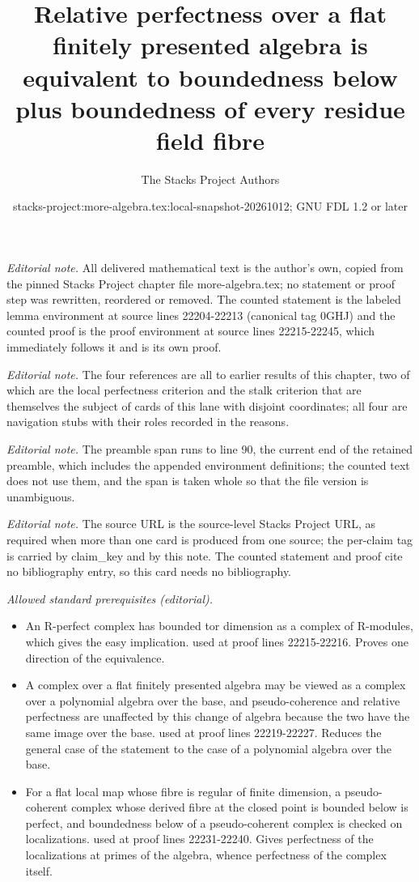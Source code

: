 \documentclass[10pt,a4paper]{amsart}
\title{Relative perfectness over a flat finitely presented algebra is equivalent to boundedness below plus boundedness of every residue field fibre}
\author{The Stacks Project Authors}
\date{stacks-project:more-algebra.tex:local-snapshot-20261012; GNU FDL 1.2 or later}
\theoremstyle{plain}
\theoremstyle{definition}
\theoremstyle{remark}
\numberwithin{equation}{subsection}
\begin{document}
\maketitle
\setcounter{subsection}{1}
\noindent\textit{Editorial note.} All delivered mathematical text is the author's own, copied from the pinned Stacks Project chapter file more-algebra.tex; no statement or proof step was rewritten, reordered or removed. The counted statement is the labeled lemma environment at source lines 22204-22213 (canonical tag 0GHJ) and the counted proof is the proof environment at source lines 22215-22245, which immediately follows it and is its own proof.\par\medskip
\noindent\textit{Editorial note.} The four references are all to earlier results of this chapter, two of which are the local perfectness criterion and the stalk criterion that are themselves the subject of cards of this lane with disjoint coordinates; all four are navigation stubs with their roles recorded in the reasons.\par\medskip
\noindent\textit{Editorial note.} The preamble span runs to line 90, the current end of the retained preamble, which includes the appended environment definitions; the counted text does not use them, and the span is taken whole so that the file version is unambiguous.\par\medskip
\noindent\textit{Editorial note.} The source URL is the source-level Stacks Project URL, as required when more than one card is produced from one source; the per-claim tag is carried by claim\_key and by this note. The counted statement and proof cite no bibliography entry, so this card needs no bibliography.\par\medskip
\noindent\textit{Allowed standard prerequisites (editorial).}\begin{itemize}
\item An R-perfect complex has bounded tor dimension as a complex of R-modules, which gives the easy implication. used at proof lines 22215-22216. Proves one direction of the equivalence.
\item A complex over a flat finitely presented algebra may be viewed as a complex over a polynomial algebra over the base, and pseudo-coherence and relative perfectness are unaffected by this change of algebra because the two have the same image over the base. used at proof lines 22219-22227. Reduces the general case of the statement to the case of a polynomial algebra over the base.
\item For a flat local map whose fibre is regular of finite dimension, a pseudo-coherent complex whose derived fibre at the closed point is bounded below is perfect, and boundedness below of a pseudo-coherent complex is checked on localizations. used at proof lines 22231-22240. Gives perfectness of the localizations at primes of the algebra, whence perfectness of the complex itself.
\end{itemize}\medskip
\end{document}
